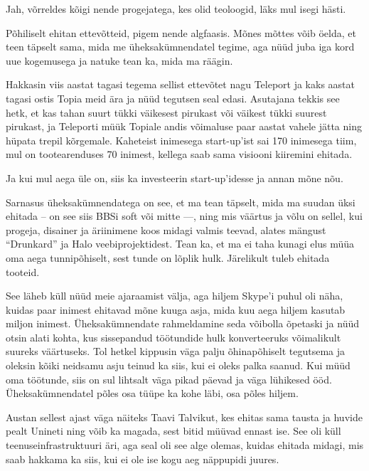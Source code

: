 
Jah, võrreldes kõigi nende progejatega, kes olid teoloogid, läks mul isegi 
hästi.


Põhiliselt ehitan ettevõtteid, pigem nende algfaasis. 
Mõnes mõttes võib öelda, et teen täpselt sama, mida me üheksakümnendatel 
tegime, aga nüüd juba iga kord uue kogemusega ja
natuke tean ka, mida ma räägin. 

Hakkasin viis 
aastat tagasi tegema sellist ettevõtet nagu Teleport ja kaks aastat tagasi ostis Topia
meid ära ja nüüd tegutsen seal edasi. Asutajana tekkis see hetk, et kas tahan suurt tükki 
väikesest pirukast või väikest tükki suurest pirukast, ja Teleporti müük 
Topiale andis võimaluse paar aastat vahele jätta ning hüpata trepil 
kõrgemale. Kaheteist inimesega start-up'ist sai 170 inimesega tiim, mul on tootearenduses 70 
inimest, kellega saab sama visiooni kiiremini ehitada. 

Ja kui mul aega üle on, siis ka investeerin start-up'idesse ja annan mõne
nõu. 

Sarnasus üheksakümnendatega on see, et ma tean täpselt, mida ma suudan üksi 
ehitada -- on see siis BBSi soft või mitte ---, ning mis väärtus ja võlu 
on sellel, kui progeja, disainer ja äriinimene koos midagi valmis teevad, alates mängust \enquote{Drunkard} ja 
Halo veebiprojektidest. Tean ka, et ma ei taha kunagi elus müüa oma aega 
tunnipõhiselt, sest tunde on lõplik hulk. Järelikult tuleb ehitada tooteid. 

See läheb küll nüüd meie ajaraamist välja, aga hiljem 
Skype'i puhul oli näha, kuidas paar inimest ehitavad mõne kuuga asja, 
mida kuu aega hiljem kasutab miljon inimest. Üheksakümnendate 
rahmeldamine seda võibolla õpetaski ja nüüd otsin alati kohta, kus 
sissepandud töötundide hulk konverteeruks võimalikult suureks väärtuseks. Tol 
hetkel kippusin väga palju õhinapõhiselt tegutsema ja 
oleksin kõiki neidsamu asju teinud ka siis, kui ei oleks palka saanud. Kui 
müüd oma töötunde, siis on sul lihtsalt väga pikad päevad ja väga lühikesed 
ööd. Üheksakümnendatel põles osa tüüpe ka kohe läbi, osa põles hiljem. 

Austan sellest ajast väga näiteks
Taavi Talvikut, kes ehitas sama tausta ja huvide 
pealt Unineti ning võib ka magada, sest bitid müüvad 
ennast ise. See oli küll teenuseinfrastruktuuri äri, aga seal oli see alge 
olemas, kuidas ehitada midagi, mis saab hakkama ka siis, kui ei ole ise kogu 
aeg näppupidi juures.